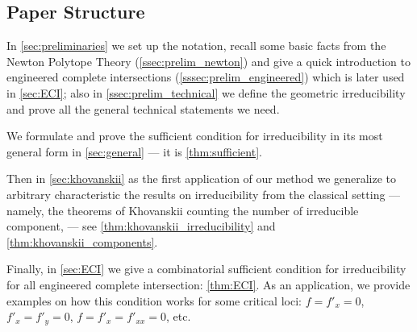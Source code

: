 

\subsection{Paper Structure}
In \autoref{sec:preliminaries} we set up the notation, recall some basic facts from the Newton Polytope Theory (\autoref{ssec:prelim_newton}) and give a quick introduction to engineered complete intersections (\autoref{sssec:prelim_engineered}) which is later used in \autoref{sec:ECI}; also in \autoref{ssec:prelim_technical} we define the geometric irreducibility and prove all the general technical statements we need.

We formulate and prove the sufficient condition for irreducibility in its most general form in \autoref{sec:general} --- it is \autoref{thm:sufficient}.

Then in \autoref{sec:khovanskii} as the first application of our method we generalize to arbitrary characteristic the results on irreducibility from the classical setting --- namely, the theorems of Khovanskii counting the number of irreducible component, \cite{Khovanskii2016} --- see \autoref{thm:khovanskii_irreducibility} and \autoref{thm:khovanskii_components}.

Finally, in \autoref{sec:ECI} we give a combinatorial sufficient condition for irreducibility for all engineered complete intersection: \autoref{thm:ECI}. As an application, we provide examples on how this condition works for some critical loci: $f = f'_x = 0$, $f'_x = f'_y = 0$, $f = f'_x = f'_{xx} = 0$, etc. 